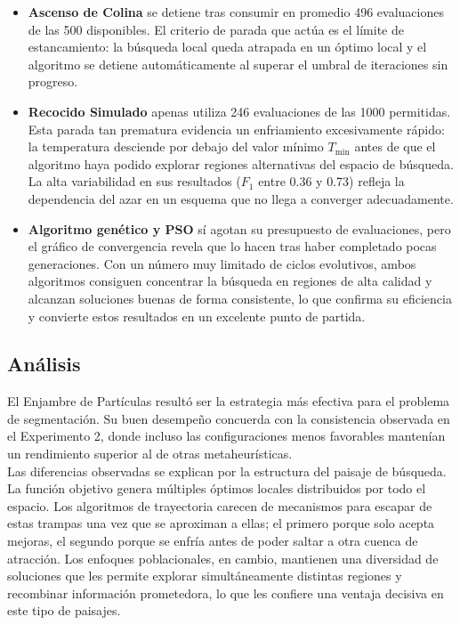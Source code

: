 \documentclass[letterpaper, 12pt]{report}
\begin{document}
\begin{itemize}
    \item \textbf{Ascenso de Colina} se detiene tras consumir en promedio 496 evaluaciones de las 500 disponibles. El criterio de parada que actúa es el límite de estancamiento: la búsqueda local queda atrapada en un óptimo local y el algoritmo se detiene automáticamente al superar el umbral de iteraciones sin progreso.

    \item \textbf{Recocido Simulado} apenas utiliza 246 evaluaciones de las 1000 permitidas. Esta parada tan prematura evidencia un enfriamiento excesivamente rápido: la temperatura desciende por debajo del valor mínimo \(T_{\min}\) antes de que el algoritmo haya podido explorar regiones alternativas del espacio de búsqueda. La alta variabilidad en sus resultados (\(F_1\) entre 0.36 y 0.73) refleja la dependencia del azar en un esquema que no llega a converger adecuadamente.
   
    \item \textbf{Algoritmo genético y PSO} sí agotan su presupuesto de evaluaciones, pero el gráfico de convergencia revela que lo hacen tras haber completado pocas generaciones. Con un número muy limitado de ciclos evolutivos, ambos algoritmos consiguen concentrar la búsqueda en regiones de alta calidad y alcanzan soluciones buenas de forma consistente, lo que confirma su eficiencia y convierte estos resultados en un excelente punto de partida.
\end{itemize}

\subsection{Análisis}

El Enjambre de Partículas resultó ser la estrategia más efectiva para el problema de segmentación. Su buen desempeño concuerda con la consistencia observada en el Experimento 2, donde incluso las configuraciones menos favorables mantenían un rendimiento superior al de otras metaheurísticas. \\



Las diferencias observadas se explican por la estructura del paisaje de búsqueda. La función objetivo genera múltiples óptimos locales distribuidos por todo el espacio. Los algoritmos de trayectoria carecen de mecanismos para escapar de estas trampas una vez que se aproximan a ellas; el primero porque solo acepta mejoras, el segundo porque se enfría antes de poder saltar a otra cuenca de atracción. Los enfoques poblacionales, en cambio, mantienen una diversidad de soluciones que les permite explorar simultáneamente distintas regiones y recombinar información prometedora, lo que les confiere una ventaja decisiva en este tipo de paisajes. \\
\end{document}
